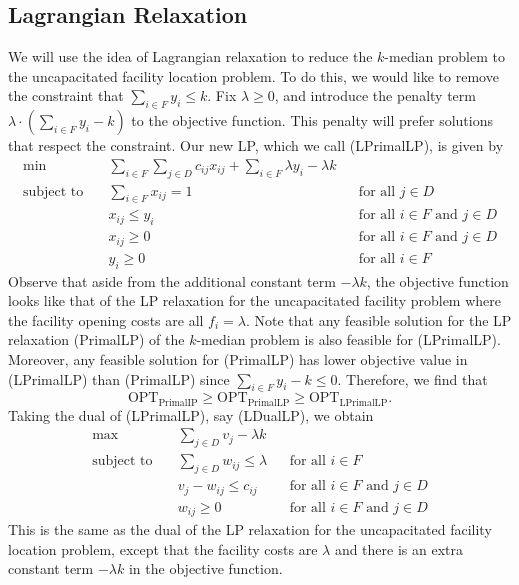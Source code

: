\subsection{Lagrangian Relaxation} \label{subsec:9.2}
We will use the idea of Lagrangian relaxation to reduce the $k$-median 
problem to the uncapacitated facility location problem. To do this, 
we would like to remove the constraint that $\sum_{i\in F} y_i \leq k$. 
Fix $\lambda \geq 0$, and introduce the penalty term $\lambda \cdot (\sum_{i\in F} y_i - k)$
to the objective function. This penalty will prefer solutions that 
respect the constraint. Our new LP, which we call (LPrimalLP), is given by 
\begin{align*}
    \min\quad & \sum_{i\in F} \sum_{j\in D} c_{ij} x_{ij} + \sum_{i\in F} \lambda y_i - \lambda k \\ 
    \text{subject to}\quad & \sum_{i\in F} x_{ij} = 1
    && \text{for all $j \in D$} \\
    & x_{ij} \leq y_i && \text{for all $i \in F$ and $j \in D$} \\
    & x_{ij} \geq 0 && \text{for all $i \in F$ and $j \in D$} \\ 
    & y_i \geq 0 && \text{for all $i \in F$}
\end{align*}
Observe that aside from the additional constant term $-\lambda k$, the objective 
function looks like that of the LP relaxation for the uncapacitated 
facility problem where the facility opening costs are all $f_i = \lambda$. 
Note that any feasible solution for the LP relaxation (PrimalLP) of the $k$-median 
problem is also feasible for (LPrimalLP). Moreover, any feasible 
solution for (PrimalLP) has lower objective value in (LPrimalLP) 
than (PrimalLP) since $\sum_{i\in F} y_i - k \leq 0$. Therefore, we find that 
\[ \text{OPT}_{\text{PrimalIP}} \geq \text{OPT}_{\text{PrimalLP}} \geq 
\text{OPT}_{\text{LPrimalLP}}. \] 
Taking the dual of (LPrimalLP), say (LDualLP), we obtain 
\begin{align*}
    \max\quad & \sum_{j\in D} v_j - \lambda k \\ 
    \text{subject to}\quad & \sum_{j\in D} w_{ij} \leq \lambda 
    && \text{for all $i \in F$} \\
    & v_j - w_{ij} \leq c_{ij} && \text{for all $i \in F$ and $j \in D$} \\
    & w_{ij} \geq 0 && \text{for all $i \in F$ and $j \in D$} 
\end{align*}
This is the same as the dual of the LP relaxation for the 
uncapacitated facility location problem, except that the facility costs 
are $\lambda$ and there is an extra constant term $-\lambda k$ in the 
objective function. 

